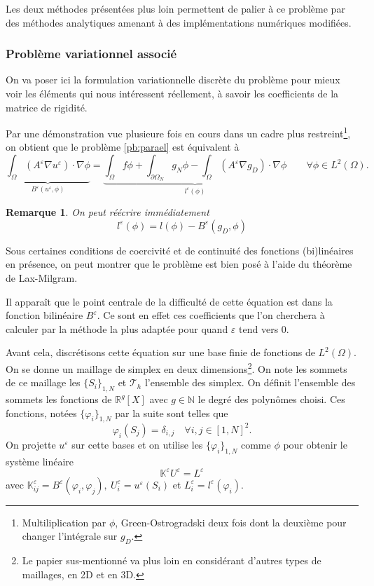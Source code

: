 \documentclass[11pt]{article}
\newtheorem{rmq}{Remarque}
\newcommand{\N}{\mathbb{N}}
\newcommand{\R}{\mathbb{R}}
\newcommand{\K}{\mathbb{K}}
\newcommand{\T}{\mathcal{T}}
\newcommand{\Ae}{A^\varepsilon}
\newcommand{\Be}{B^\varepsilon}
\newcommand{\ue}{u^\varepsilon}
\begin{document}
Les deux méthodes présentées plus loin permettent de palier à ce problème par des méthodes analytiques amenant à des implémentations numériques modifiées.


\subsubsection{Problème variationnel associé}
\label{sec:pbvar}

On va poser ici la formulation variationnelle discrète du problème pour mieux voir les éléments qui nous intéressent réellement, à savoir les coefficients
de la matrice de rigidité.

Par une démonstration vue plusieure fois en cours dans un cadre plus restreint\footnote{Multiliplication par $\phi$,
  Green-Ostrogradski deux fois dont la deuxième pour changer l'intégrale sur $g_D$.}, on obtient que le problème \ref{pb:parael} est équivalent à
\begin{equation}
  \underbrace{\int_\Omega (\Ae \nabla \ue)\cdot \nabla \phi}_{\Be(\ue, \phi)} =
  \underbrace{\int_\Omega f \phi + \int_{\partial \Omega_N} g_N \phi - \int_{\Omega} (\Ae \nabla g_D)\cdot \nabla \phi}_{l^{\varepsilon}(\phi)}
  \qquad \forall \phi \in L^2(\Omega).
\end{equation}

\begin{rmq}
  On peut réécrire immédiatement
  \[
    l^{\varepsilon}(\phi) = l(\phi) - \Be(g_D, \phi)
  \]
\end{rmq}

Sous certaines conditions de coercivité et de continuité des fonctions (bi)linéaires en présence, on peut montrer que le problème est bien posé à l'aide
du théorème de Lax-Milgram.

Il apparaît que le point centrale de la difficulté de cette équation est dans la fonction bilinéaire $\Be$. Ce sont en effet ces coefficients que l'on
cherchera à calculer par la méthode la plus adaptée pour quand $\varepsilon$ tend vers 0.

Avant cela, discrétisons cette équation sur une base finie de fonctions de $L^2(\Omega)$. On se donne un maillage de simplex en deux
dimensions\footnote{Le papier sus-mentionné va plus loin en considérant d'autres types de maillages, en 2D et en 3D.}. On note les sommets de ce maillage
les $\{S_i\}_{1, N}$ et $\T_h$ l'ensemble des simplex. On définit l'ensemble des sommets les fonctions de $\R^g[X]$ avec $g\in\N$ le degré des polynômes
choisi. Ces fonctions, notées $\{\varphi_i\}_{1, N}$ par la suite sont telles que
\[
  \varphi_i(S_j) = \delta_{i,j} \quad \forall i, j \in [1, N]^2.
\]
On projette $\ue$ sur cette bases et on utilise les $\{\varphi_i\}_{1, N}$ comme $\phi$ pour obtenir le système linéaire 
\[
  \K^\varepsilon U^\varepsilon = L^\varepsilon
\]
avec $\K^\varepsilon_{ij} = \Be(\varphi_i, \varphi_j), ~ U^\varepsilon_i = \ue(S_i)$ et $L^\varepsilon_i = l^\varepsilon(\varphi_i)$.
\end{document}

